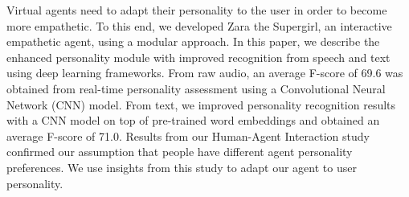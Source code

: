 Virtual agents need to adapt their personality to the user in order to become more empathetic. To this end, we developed Zara the Supergirl, an interactive empathetic agent, using a modular approach. In this paper, we describe the enhanced personality module with improved recognition from speech and text using deep learning frameworks. From raw audio, an average F-score of 69.6 was obtained from real-time personality assessment using a Convolutional Neural Network (CNN) model. From text, we improved personality recognition results with a CNN model on top of pre-trained word embeddings and obtained an average F-score of 71.0. Results from our Human-Agent Interaction study confirmed our assumption that people have different agent personality preferences. We use insights from this study to adapt our agent to user personality.
